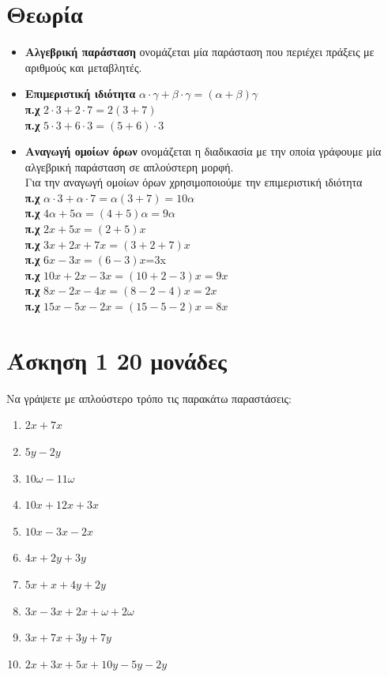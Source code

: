 \documentclass[a4paper,10pt]{report}
\begin{document}
\section*{Θεωρία \hfill \small{}}
\begin{itemize}
 \item \textbf{Αλγεβρική παράσταση} ονομάζεται μία παράσταση που περιέχει πράξεις με αριθμούς και μεταβλητές.
 \item \textbf{Επιμεριστική ιδιότητα} \quad $α\cdot γ+β\cdot γ=(α+β)γ$\\
       \textbf{π.χ} $2\cdot3+2\cdot7=2(3+7)$ \\
       \textbf{π.χ} $5\cdot3+6\cdot3=(5+6)\cdot3$ 
 \item \textbf{Αναγωγή ομοίων όρων} ονομάζεται η διαδικασία με την οποία γράφουμε μία αλγεβρική παράσταση σε 
               απλούστερη μορφή.\\ 
               Για την αναγωγή ομοίων όρων χρησιμοποιούμε την επιμεριστική ιδιότητα \\
        \textbf{π.χ} \quad $α\cdot3+α\cdot7=α(3+7)=10α$\\
        \textbf{π.χ} \quad $4α+5α=(4+5)α=9α$\\
        \textbf{π.χ} \quad $2x+5x=(2+5)x$\\
        \textbf{π.χ} \quad $3x+2x+7x=(3+2+7)x$\\
        \textbf{π.χ} \quad $6x-3x=(6-3)x$=3x\\
        \textbf{π.χ} \quad $10x+2x-3x=(10+2-3)x=9x$\\
        \textbf{π.χ} \quad $8x-2x-4x=(8-2-4)x=2x$\\
        \textbf{π.χ} \quad $15x-5x-2x=(15-5-2)x=8x$
\end{itemize}


\section*{Άσκηση 1  \hfill \small{20 μονάδες}}
Να γράψετε με απλούστερο τρόπο τις παρακάτω παραστάσεις:
\begin{enumerate}[1)]
 \item $2x+7x$
 \item $5y-2y$
 \item $10ω-11ω$
 \item $10x+12x+3x$
 \item $10x-3x-2x$
 \item $4x+2y+3y$
 \item $5x+x+4y+2y$
 \item $3x-3x+2x+ω+2ω$
 \item $3x+7x+3y+7y$
 \item $2x+3x+5x+10y-5y-2y$
\end{enumerate}
\end{document}
